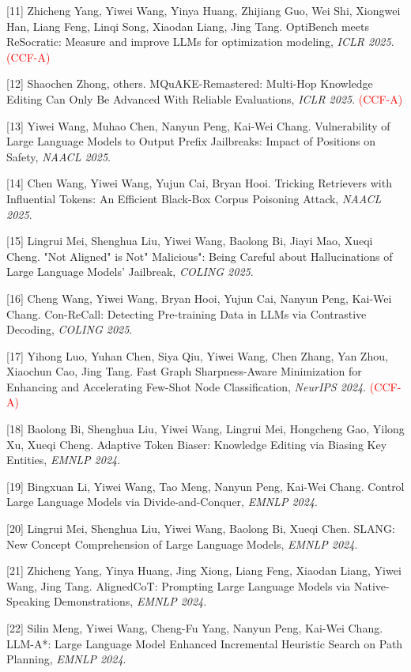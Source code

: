 [11] Zhicheng Yang, Yiwei Wang, Yinya Huang, Zhijiang Guo, Wei Shi, Xiongwei Han, Liang Feng, Linqi Song, Xiaodan Liang, Jing Tang. OptiBench meets ReSocratic: Measure and improve LLMs for optimization modeling, \textit{ICLR 2025}. \textcolor{red}{(CCF-A)}

[12] Shaochen Zhong, others. MQuAKE-Remastered: Multi-Hop Knowledge Editing Can Only Be Advanced With Reliable Evaluations, \textit{ICLR 2025}. \textcolor{red}{(CCF-A)}

[13] Yiwei Wang, Muhao Chen, Nanyun Peng, Kai-Wei Chang. Vulnerability of Large Language Models to Output Prefix Jailbreaks: Impact of Positions on Safety, \textit{NAACL 2025}.

[14] Chen Wang, Yiwei Wang, Yujun Cai, Bryan Hooi. Tricking Retrievers with Influential Tokens: An Efficient Black-Box Corpus Poisoning Attack, \textit{NAACL 2025}.

[15] Lingrui Mei, Shenghua Liu, Yiwei Wang, Baolong Bi, Jiayi Mao, Xueqi Cheng. "Not Aligned" is Not" Malicious": Being Careful about Hallucinations of Large Language Models' Jailbreak, \textit{COLING 2025}.

[16] Cheng Wang, Yiwei Wang, Bryan Hooi, Yujun Cai, Nanyun Peng, Kai-Wei Chang. Con-ReCall: Detecting Pre-training Data in LLMs via Contrastive Decoding, \textit{COLING 2025}.

[17] Yihong Luo, Yuhan Chen, Siya Qiu, Yiwei Wang, Chen Zhang, Yan Zhou, Xiaochun Cao, Jing Tang. Fast Graph Sharpness-Aware Minimization for Enhancing and Accelerating Few-Shot Node Classification, \textit{NeurIPS 2024}. \textcolor{red}{(CCF-A)}

[18] Baolong Bi, Shenghua Liu, Yiwei Wang, Lingrui Mei, Hongcheng Gao, Yilong Xu, Xueqi Cheng. Adaptive Token Biaser: Knowledge Editing via Biasing Key Entities, \textit{EMNLP 2024}.

[19] Bingxuan Li, Yiwei Wang, Tao Meng, Nanyun Peng, Kai-Wei Chang. Control Large Language Models via Divide-and-Conquer, \textit{EMNLP 2024}.

[20] Lingrui Mei, Shenghua Liu, Yiwei Wang, Baolong Bi, Xueqi Chen. SLANG: New Concept Comprehension of Large Language Models, \textit{EMNLP 2024}.

[21] Zhicheng Yang, Yinya Huang, Jing Xiong, Liang Feng, Xiaodan Liang, Yiwei Wang, Jing Tang. AlignedCoT: Prompting Large Language Models via Native-Speaking Demonstrations, \textit{EMNLP 2024}.

[22] Silin Meng, Yiwei Wang, Cheng-Fu Yang, Nanyun Peng, Kai-Wei Chang. LLM-A*: Large Language Model Enhanced Incremental Heuristic Search on Path Planning, \textit{EMNLP 2024}.


